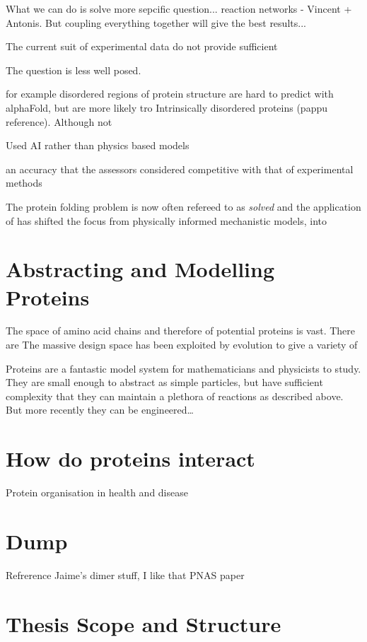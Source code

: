 What we can do is solve more sepcific question... reaction networks - Vincent + Antonis. But coupling everything together will give the best results...



The current suit of experimental data do not provide sufficient 

The question is less well posed. 

for example disordered regions of protein structure are hard to predict with alphaFold, but are more likely tro 
Intrinsically disordered proteins (pappu reference).
\cite{jumper_highly_2021}
Although not 

Used AI rather than physics based models

an  accuracy that the assessors considered competitive with that of experimental methods

The protein folding problem is now often refereed to as \textit{solved} and the application of  has shifted the focus from physically informed mechanistic models, into

\section{Abstracting and Modelling Proteins}

The space of amino acid chains and therefore of potential proteins is vast. There are  The massive design space has been exploited by evolution to give a variety of 

Proteins are a fantastic model system for mathematicians and physicists to study. They are small enough to abstract as simple particles, but have sufficient complexity that they can maintain a plethora of reactions as described above. But more recently they can be engineered…

\section{How do proteins interact}

Protein organisation in health and disease

\section{Dump}

Refrerence Jaime’s dimer stuff, I like that PNAS paper

\section{Thesis Scope and Structure}

